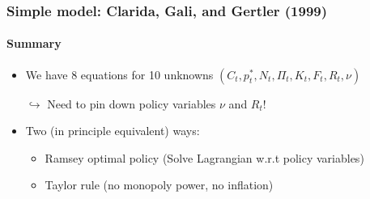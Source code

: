 \documentclass[handout]{beamer}  %
\begin{document}
\begin{frame}\frametitle{Simple model: Clarida, Gali, and Gertler (1999)}\framesubtitle{Summary}
\begin{itemize}
  \item We have 8 equations for 10 unknowns $(C_t,p_t^*, N_t, \Pi_t, K_t, F_t, R_t, \nu)$
  \item[$\hookrightarrow$] Need to pin down policy variables $\nu$ and $R_t$!
  \item Two (in principle equivalent) ways:
  \begin{itemize}
    \item Ramsey optimal policy (Solve Lagrangian w.r.t policy variables)
    \item Taylor rule (no monopoly power, no inflation)
  \end{itemize}
\end{itemize}
\end{frame}
\end{document}
